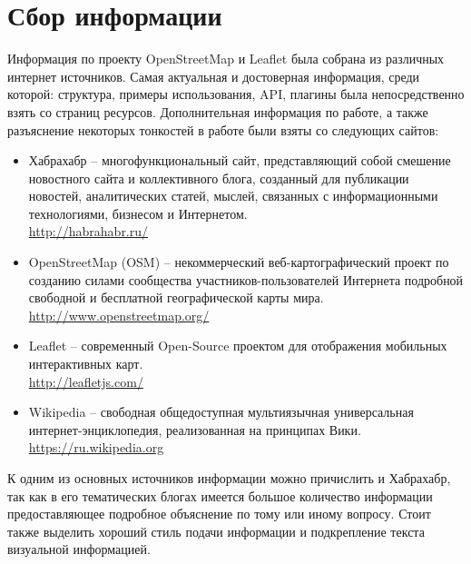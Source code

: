 \documentclass[a4paper, 14pt]{extreport}
\begin{document}
    \chapter{Сбор информации}
    Информация по проекту OpenStreetMap и Leaflet была собрана из различных интернет источников. Самая 
    актуальная и достоверная информация, среди которой: структура, примеры использования, API, плагины 
    была непосредственно взять со страниц ресурсов. Дополнительная информация по работе, а также 
    разъяснение некоторых тонкостей в работе были взяты со следующих сайтов:
    \begin{itemize}
        \item Хабрахабр -- многофункциональный сайт, представляющий собой смешение новостного сайта 
            и коллективного блога, созданный для публикации новостей, аналитических статей, мыслей, 
            связанных с информационными технологиями, бизнесом и Интернетом.\\
            \url{http://habrahabr.ru/}
        \item OpenStreetMap (OSM) -- некоммерческий веб-картографический проект по созданию силами 
            сообщества участников-пользователей Интернета подробной свободной и бесплатной 
            географической карты мира.\\
            \url{http://www.openstreetmap.org/}
        \item Leaflet -- современный Open-Source проектом для отображения мобильных 
            интерактивных карт.\\
            \url{http://leafletjs.com/}
        \item Wikipedia -- свободная общедоступная мультиязычная универсальная 
            интернет-энциклопедия, реализованная на принципах Вики.\\
            \url{https://ru.wikipedia.org}
    \end{itemize}
    К одним из основных источников информации можно причислить и Хабрахабр, так как в его тематических 
    блогах имеется большое количество информации предоставляющее подробное объяснение по тому или иному 
    вопросу. Стоит также выделить хороший стиль подачи информации и подкрепление текста визуальной 
    информацией.
\end{document}
